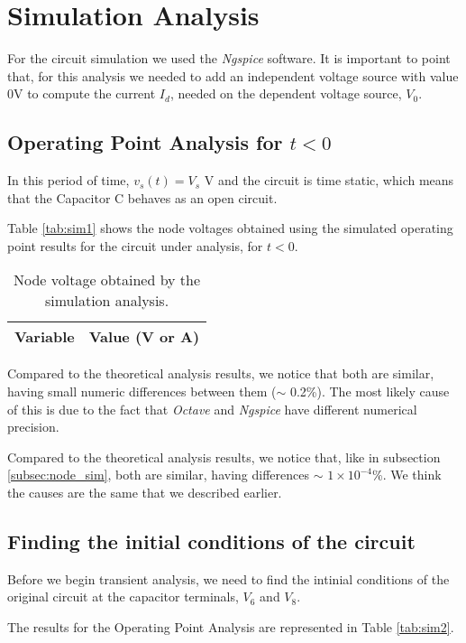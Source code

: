 \section{Simulation Analysis}
\label{sec:simulation}

For the circuit simulation we used the \textit{Ngspice} software. It is important to point that, for this analysis we needed to add an independent voltage source with value 0V to compute the current $I_d$, needed on the dependent voltage source, $V_0$.

\subsection{Operating Point Analysis for $t<0$}
\label{subsec:op_point}

In this period of time, $v_s (t)= V_s$ V and the circuit is time static, which means that the Capacitor C behaves as an open circuit. 

Table \ref{tab:sim1} shows the node voltages obtained using the simulated operating point results for the circuit under analysis, for $t<0$.
\begin{table}[H]
  \centering
  \begin{tabular}{|l|r|}
    \hline    
    {\bf Variable} & {\bf Value (V or A)} \\ \hline
    
  \end{tabular}
  \caption{Node voltage obtained by the simulation analysis.}
  \label{tab:sim_op_V}
\end{table}

Compared to the theoretical analysis results, we notice that both are similar, having small numeric differences between them ($\sim$ 0.2\%). The most likely cause of this is due to the fact that \textit{Octave} and \textit{Ngspice} have different numerical precision.


Compared to the theoretical analysis results, we notice that, like in subsection \ref{subsec:node_sim}, both are similar, having differences $\sim$ $1\times10^{-4}$\%. We think the causes are the same that we described earlier.

\newpage

\subsection{Finding the initial conditions of the circuit}
\label{subsec:init_conds}

Before we begin transient analysis, we need to find the intinial conditions of the original circuit at the capacitor terminals, $V_6$ and $V_8$.
\par
The results for the Operating Point Analysis are represented in Table \ref{tab:sim2}.


